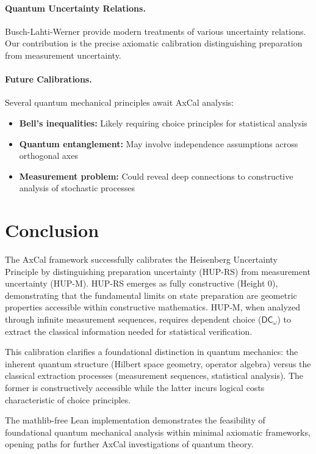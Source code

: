 \documentclass[11pt]{article}
\newcommand{\DCw}{\mathsf{DC}_{\omega}}
\theoremstyle{plain}
\theoremstyle{definition}
\theoremstyle{remark}
\begin{document}
\paragraph{Quantum Uncertainty Relations.}
Busch-Lahti-Werner \cite{BuschLahtiWerner} provide modern treatments of various uncertainty relations. Our contribution is the precise axiomatic calibration distinguishing preparation from measurement uncertainty.

\paragraph{Future Calibrations.}
Several quantum mechanical principles await AxCal analysis:
\begin{itemize}
\item \textbf{Bell's inequalities:} Likely requiring choice principles for statistical analysis
\item \textbf{Quantum entanglement:} May involve independence assumptions across orthogonal axes  
\item \textbf{Measurement problem:} Could reveal deep connections to constructive analysis of stochastic processes
\end{itemize}

\section{Conclusion}

The AxCal framework successfully calibrates the Heisenberg Uncertainty Principle by distinguishing preparation uncertainty (HUP-RS) from measurement uncertainty (HUP-M). HUP-RS emerges as fully constructive (Height 0), demonstrating that the fundamental limits on state preparation are geometric properties accessible within constructive mathematics. HUP-M, when analyzed through infinite measurement sequences, requires dependent choice ($\DCw$) to extract the classical information needed for statistical verification.

This calibration clarifies a foundational distinction in quantum mechanics: the inherent quantum structure (Hilbert space geometry, operator algebra) versus the classical extraction processes (measurement sequences, statistical analysis). The former is constructively accessible while the latter incurs logical costs characteristic of choice principles.

The mathlib-free Lean implementation demonstrates the feasibility of foundational quantum mechanical analysis within minimal axiomatic frameworks, opening paths for further AxCal investigations of quantum theory.
\end{document}
